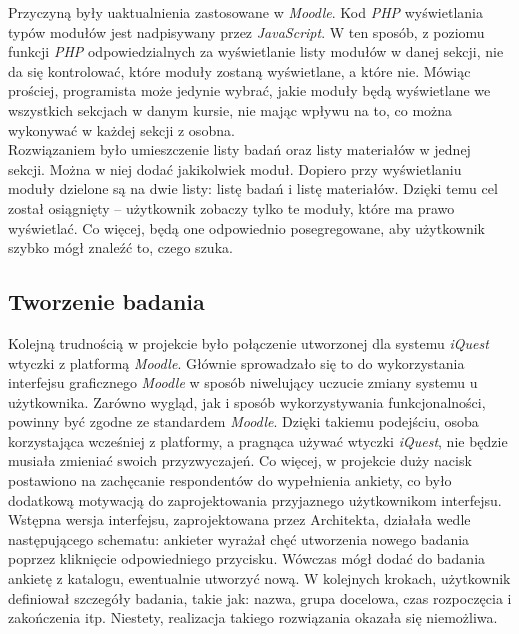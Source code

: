 Przyczyną były uaktualnienia zastosowane w \textit{Moodle}. Kod \textit{PHP} wyświetlania typów modułów jest nadpisywany przez \textit{JavaScript}. W ten sposób, z poziomu funkcji \textit{PHP} odpowiedzialnych za wyświetlanie listy modułów w danej sekcji, nie da się kontrolować, które moduły zostaną wyświetlane, a które nie. Mówiąc prościej, programista może jedynie wybrać, jakie moduły będą wyświetlane we wszystkich sekcjach w danym kursie, nie mając wpływu na to, co można wykonywać w każdej sekcji z osobna. \\

Rozwiązaniem było umieszczenie listy badań oraz listy materiałów w jednej sekcji. Można w niej dodać jakikolwiek moduł. Dopiero przy wyświetlaniu moduły dzielone są na dwie listy: listę badań i listę materiałów. Dzięki temu cel został osiągnięty -- użytkownik zobaczy tylko te moduły, które ma prawo wyświetlać. Co więcej, będą one odpowiednio posegregowane, aby użytkownik szybko mógł znaleźć to, czego szuka.

\subsection{Tworzenie badania}
\label{Chapter628}

Kolejną trudnością w projekcie było połączenie utworzonej dla systemu \textit{iQuest} wtyczki z platformą \textit{Moodle}. Głównie sprowadzało się to do wykorzystania interfejsu graficznego \textit{Moodle} w sposób niwelujący uczucie zmiany systemu u użytkownika. Zarówno wygląd, jak i sposób wykorzystywania funkcjonalności, powinny być zgodne ze standardem \textit{Moodle}. Dzięki takiemu podejściu, osoba korzystająca wcześniej z platformy, a pragnąca używać wtyczki \textit{iQuest}, nie będzie musiała zmieniać swoich przyzwyczajeń. Co więcej, w projekcie duży nacisk postawiono na zachęcanie respondentów do wypełnienia ankiety, co było dodatkową motywacją do zaprojektowania przyjaznego użytkownikom interfejsu. \\

Wstępna wersja interfejsu, zaprojektowana przez Architekta, działała wedle następującego schematu: ankieter wyrażał chęć utworzenia nowego badania poprzez kliknięcie odpowiedniego przycisku. Wówczas mógł dodać do badania ankietę z katalogu, ewentualnie utworzyć nową. W kolejnych krokach, użytkownik definiował szczegóły badania, takie jak: nazwa, grupa docelowa, czas rozpoczęcia i zakończenia itp. Niestety, realizacja takiego rozwiązania okazała się niemożliwa. \\

